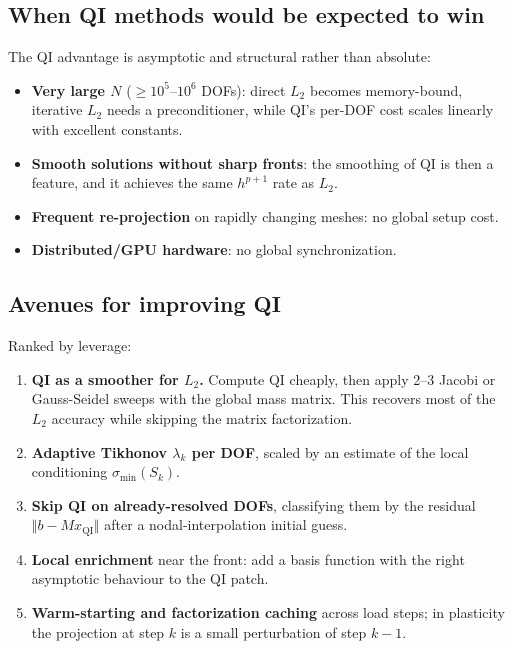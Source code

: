 \documentclass[11pt,a4paper]{article}
\begin{document}
\subsection{When QI methods would be expected to win}

The QI advantage is asymptotic and structural rather than absolute:
\begin{itemize}[leftmargin=2em]
    \item \textbf{Very large $N$} ($\geq 10^5$--$10^6$ DOFs):
    direct $L_2$ becomes memory-bound, iterative $L_2$ needs a
    preconditioner, while QI's per-DOF cost scales linearly with
    excellent constants.
    \item \textbf{Smooth solutions without sharp fronts}: the
    smoothing of QI is then a feature, and it achieves the
    same $h^{p+1}$ rate as $L_2$.
    \item \textbf{Frequent re-projection} on rapidly changing meshes:
    no global setup cost.
    \item \textbf{Distributed/GPU hardware}: no global synchronization.
\end{itemize}

\subsection{Avenues for improving QI}

Ranked by leverage:
\begin{enumerate}
    \item \textbf{QI as a smoother for $L_2$.}  Compute QI cheaply, then
    apply 2--3 Jacobi or Gauss-Seidel sweeps with the global mass
    matrix.  This recovers most of the $L_2$ accuracy while skipping
    the matrix factorization.
    \item \textbf{Adaptive Tikhonov $\lambda_k$ per DOF}, scaled by an
    estimate of the local conditioning $\sigma_{\min}(S_k)$.
    \item \textbf{Skip QI on already-resolved DOFs}, classifying them
    by the residual $\Vert b - M x_{\mathrm{QI}}\Vert$ after a
    nodal-interpolation initial guess.
    \item \textbf{Local enrichment} near the front: add a basis
    function with the right asymptotic behaviour to the QI patch.
    \item \textbf{Warm-starting and factorization caching} across load
    steps; in plasticity the projection at step $k$ is a small
    perturbation of step $k-1$.
\end{enumerate}
\end{document}
